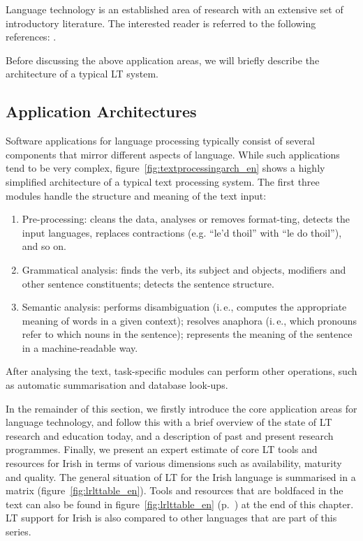 \documentclass[]{../../metanetpaper}
\begin{document}
\begin{multicols}{2}
Language technology is an established area of research with an extensive set of introductory literature. The interested reader is referred to the following references:  \cite{carstensen-etal1, jurafsky-martin01, manning-schuetze1, lt-world1, lt-survey1}. 

Before discussing the above application areas, we will briefly describe the architecture of a typical LT system.

\subsection{Application Architectures}

Software applications for language processing typically consist of several components that mirror different aspects of language. While such applications tend to be very complex, figure~\ref{fig:textprocessingarch_en} shows a highly simplified architecture of a typical text processing system. The first three modules handle the structure and meaning of the text input:

\begin{enumerate}
\item Pre-processing: cleans the data, analyses or removes format-ting, detects the input languages, replaces contractions (e.g. ``le’d thoil'' with ``le do thoil''), and so on.
\item Grammatical analysis: finds the verb, its subject and objects, modifiers and other sentence constituents; detects the sentence structure.
\item Semantic analysis: performs disambiguation (i.\,e., computes the appropriate meaning of words in a given context); resolves anaphora (i.\,e., which pronouns refer to which nouns in the sentence); represents the meaning of the sentence in a machine-readable way.
\end{enumerate}

After analysing the text, task-specific modules can perform other operations, such as automatic summarisation and database look-ups.

In the remainder of this section, we firstly introduce the core application areas for language technology, and follow this with a brief overview of the state of LT research and education today, and a description of past and present research programmes. Finally, we present an expert estimate of core LT tools and resources for Irish in terms of various dimensions such as availability, maturity and quality. The general situation of LT for the Irish language is summarised in a matrix (figure~\ref{fig:lrlttable_en}). Tools and resources that are boldfaced in the text can also be found in figure~\ref{fig:lrlttable_en} (p.~\pageref{fig:lrlttable_en}) at the end of this chapter. LT support for Irish is also compared to other languages that are part of this series.


\end{multicols}
\end{document}
